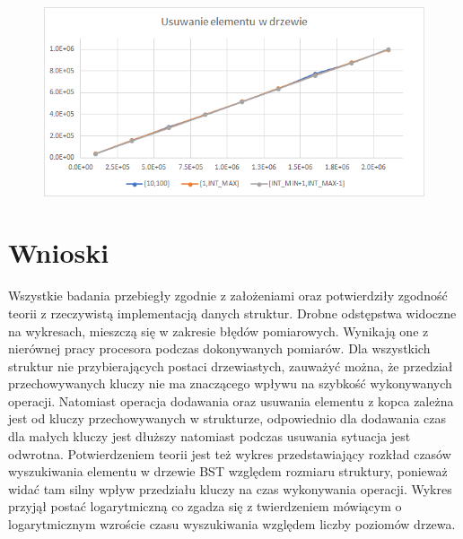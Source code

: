 \documentclass{article}
\begin{document}
\begin{figure}[h!]
\includegraphics[width=11.3cm]{images/usuwanie_drzewo_w.png}
\end{figure}

\newpage

\section{Wnioski}

Wszystkie badania przebiegły zgodnie z założeniami oraz potwierdziły zgodność teorii z rzeczywistą implementacją danych struktur. Drobne odstępstwa widoczne na wykresach, mieszczą się w zakresie błędów pomiarowych. Wynikają one z nierównej pracy procesora podczas dokonywanych pomiarów. Dla wszystkich struktur nie przybierających postaci drzewiastych, zauważyć można, że przedział przechowywanych kluczy nie ma znaczącego wpływu na szybkość \linebreak wykonywanych operacji. Natomiast operacja dodawania oraz usuwania elementu z kopca zależna jest od kluczy przechowywanych w strukturze, odpowiednio dla dodawania czas dla małych kluczy jest dłuższy natomiast podczas usuwania sytuacja jest odwrotna. Potwierdzeniem teorii jest też wykres przedstawiający rozkład czasów wyszukiwania elementu w drzewie BST względem rozmiaru struktury, ponieważ widać tam silny wpływ przedziału kluczy na czas wykonywania operacji. Wykres przyjął postać logarytmiczną co zgadza się z twierdzeniem mówiącym o logarytmicznym wzroście czasu wyszukiwania względem \linebreak liczby poziomów drzewa.
\end{document}
